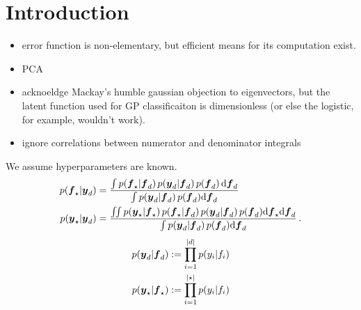 \documentclass[twoside]{article}
\begin{document}

\begin{abstract}%
\end{abstract}


\section{Introduction}

\begin{itemize}
 \item error function is non-elementary, but efficient means for its computation exist. 
 \item PCA
 \item acknoeldge Mackay's humble gaussian objection to eigenvectors, but the latent function used for GP classificaiton is dimensionless (or else the logistic, for example, wouldn't work).
\item ignore correlations between numerator and denominator integrals
\end{itemize}

We assume hyperparameters are known.
\begin{align*}
\p{\vf\st}{\vy_d}
& =
\frac{\int\p{\vf\st}{\vf_d}\p{\vy_d}{\vf_d}p(\vf_d)\,\ud\vf_d}
{\int \p{\vy_d}{\vf_d}p(\vf_d)\ud\vf_d}
\\
\p{\vy\st}{\vy_d}
& =
\frac{\iint\p{\vy\st}{\vf\st}\p{\vf\st}{\vf_d}\p{\vy_d}{\vf_d}p(\vf_d)\ud\vf\st\ud\vf_d}
{\int\p{\vy_d}{\vf_d}p(\vf_d)\ud\vf_d}\,.
\end{align*}
\begin{align*}
p\!\left(\boldsymbol{y}_d\middle\vert\boldsymbol{f}_d\right) & := \prod_{i=1}^{\left\lvert d\right\rvert}p\!\left(y_i\middle\vert f_i\right) \\
p\!\left(\boldsymbol{y}_\star\middle\vert\boldsymbol{f}_\star\right) & := \prod_{i=1}^{\left\lvert\star\right\rvert}p\!\left(y_i\middle\vert f_i\right)
\end{align*}
\end{document}
